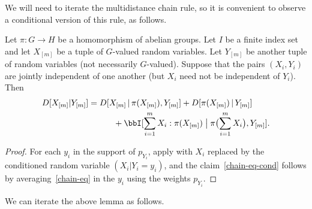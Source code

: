   We will need to iterate the multidistance chain rule, so it is convenient to observe a conditional version of this rule, as follows.

  \begin{lemma}\label{multidist-chain-rule-cond}\leanok
    Let $\pi \colon G \to H$ be a homomorphism of abelian groups.
    Let $I$ be a finite index set and let $X_{[m]}$ be a tuple of $G$-valued random variables.
    Let $Y_{[m]}$ be another tuple of random variables (not necessarily $G$-valued).
    Suppose that the pairs $(X_i, Y_i)$ are jointly independent of one another (but $X_i$ need not be independent of $Y_i$).
    Then
    \begin{align}\nonumber
        D[ X_{[m]} | Y_{[m]} ] &=  D[ X_{[m]} \,|\, \pi(X_{[m]}), Y_{[m]}] + D[ \pi(X_{[m]}) \,|\, Y_{[m]}] \\
         &\quad\qquad + \bbI[ \sum_{i=1}^m X_i : \pi(X_{[m]}) \; \big| \;  \pi\bigl(\sum_{i=1}^m X_i \bigr), Y_{[m]} ].\label{chain-eq-cond}
    \end{align}
  \end{lemma}

  \begin{proof}\leanok
  For each $y_i$ in the support of $p_{Y_i}$, apply  with $X_i$ replaced by the conditioned random variable $(X_i|Y_i=y_i)$, and the claim~\eqref{chain-eq-cond} follows by averaging~\eqref{chain-eq} in the $y_i$ using the weights $p_{Y_i}$.
  \end{proof}

  We can iterate the above lemma as follows.

